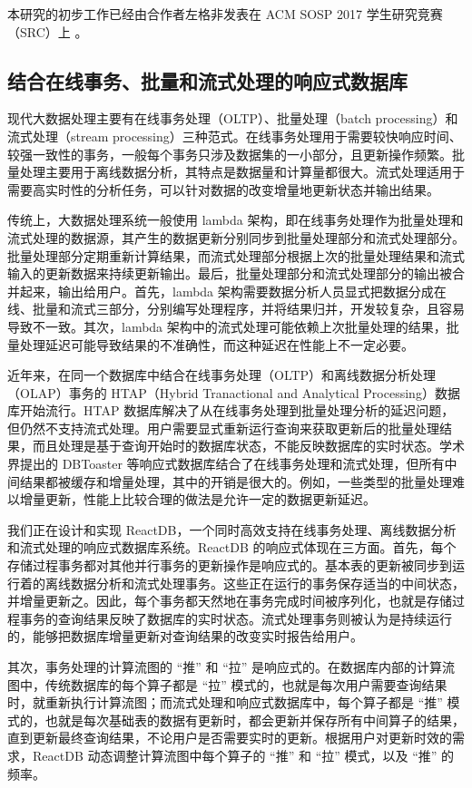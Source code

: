 本研究的初步工作已经由合作者左格非发表在 ACM SOSP 2017 学生研究竞赛（SRC）上 \cite{toms}。

\subsection{结合在线事务、批量和流式处理的响应式数据库}

现代大数据处理主要有在线事务处理（OLTP）、批量处理（batch processing）和流式处理（stream processing）三种范式。在线事务处理用于需要较快响应时间、较强一致性的事务，一般每个事务只涉及数据集的一小部分，且更新操作频繁。批量处理主要用于离线数据分析，其特点是数据量和计算量都很大。流式处理适用于需要高实时性的分析任务，可以针对数据的改变增量地更新状态并输出结果。

传统上，大数据处理系统一般使用 lambda 架构，即在线事务处理作为批量处理和流式处理的数据源，其产生的数据更新分别同步到批量处理部分和流式处理部分。批量处理部分定期重新计算结果，而流式处理部分根据上次的批量处理结果和流式输入的更新数据来持续更新输出。最后，批量处理部分和流式处理部分的输出被合并起来，输出给用户。首先，lambda 架构需要数据分析人员显式把数据分成在线、批量和流式三部分，分别编写处理程序，并将结果归并，开发较复杂，且容易导致不一致。其次，lambda 架构中的流式处理可能依赖上次批量处理的结果，批量处理延迟可能导致结果的不准确性，而这种延迟在性能上不一定必要。

近年来，在同一个数据库中结合在线事务处理（OLTP）和离线数据分析处理（OLAP）事务的 HTAP（Hybrid Tranactional and Analytical Processing）数据库开始流行。HTAP 数据库解决了从在线事务处理到批量处理分析的延迟问题，但仍然不支持流式处理。用户需要显式重新运行查询来获取更新后的批量处理结果，而且处理是基于查询开始时的数据库状态，不能反映数据库的实时状态。学术界提出的 DBToaster 等响应式数据库结合了在线事务处理和流式处理，但所有中间结果都被缓存和增量处理，其中的开销是很大的。例如，一些类型的批量处理难以增量更新，性能上比较合理的做法是允许一定的数据更新延迟。

我们正在设计和实现 ReactDB，一个同时高效支持在线事务处理、离线数据分析和流式处理的响应式数据库系统。ReactDB 的响应式体现在三方面。首先，每个存储过程事务都对其他并行事务的更新操作是响应式的。基本表的更新被同步到运行着的离线数据分析和流式处理事务。这些正在运行的事务保存适当的中间状态，并增量更新之。因此，每个事务都天然地在事务完成时间被序列化，也就是存储过程事务的查询结果反映了数据库的实时状态。流式处理事务则被认为是持续运行的，能够把数据库增量更新对查询结果的改变实时报告给用户。

其次，事务处理的计算流图的 ``推'' 和 ``拉'' 是响应式的。在数据库内部的计算流图中，传统数据库的每个算子都是 ``拉'' 模式的，也就是每次用户需要查询结果时，就重新执行计算流图；而流式处理和响应式数据库中，每个算子都是 ``推'' 模式的，也就是每次基础表的数据有更新时，都会更新并保存所有中间算子的结果，直到更新最终查询结果，不论用户是否需要实时的更新。根据用户对更新时效的需求，ReactDB 动态调整计算流图中每个算子的 ``推'' 和 ``拉'' 模式，以及 ``推'' 的频率。

